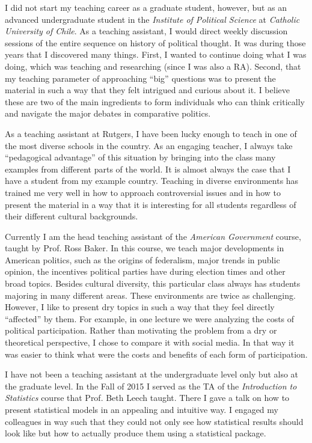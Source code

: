 \documentclass[11pt]{letter} %
\begin{document}
\begin{letter}{}
I did not start my teaching career as a graduate student, however, but as an advanced undergraduate student in the \emph{Institute of Political Science} at  \emph{Catholic University of Chile}. As a teaching assistant, I would direct weekly discussion sessions of the entire sequence on history of political thought. It was during those years that I discovered many things. First, I wanted to continue doing what I was doing, which was teaching and researching (since I was also a RA). Second, that my teaching parameter of approaching ``big'' questions was to present the material in such a way that they felt intrigued and curious about it. I believe these are two of the main ingredients to form individuals who can think critically and navigate the major debates in comparative politics. 

As a teaching assistant at Rutgers, I have been lucky enough to teach in one of the most diverse schools in the country. As an engaging teacher, I always take ``pedagogical advantage'' of this situation by bringing into the class many examples from different parts of the world. It is almost always the case that I have a student from my example country. Teaching in diverse environments has trained me very well in how to approach controversial issues and in how to present the material in a way that it is interesting for all students regardless of their different cultural backgrounds. 

Currently I am the head teaching assistant of the \emph{American Government} course, taught by Prof. Ross Baker. In this course, we teach major developments in American politics, such as the origins of federalism, major trends in public opinion, the incentives political parties have during election times and other broad topics. Besides cultural diversity, this particular class always has students majoring in many different areas. These environments are twice as challenging. However, I like to present dry topics in such a way that they feel directly ``affected'' by them. For example, in one lecture we were analyzing the costs of political participation. Rather than motivating the problem from a dry or theoretical perspective, I chose to compare it with social media. In that way it was easier to think what were the costs and benefits of each form of participation. 

I have not been a teaching assistant at the undergraduate level only but also at the graduate level. In the Fall of 2015 I served as the TA of the \emph{Introduction to Statistics} course that Prof. Beth Leech taught. There I gave a talk on how to present statistical models in an appealing and intuitive way. I engaged my colleagues in way such that they could not only see how statistical results should look like but how to actually produce them using a statistical package. 


\end{letter}
\end{document}

